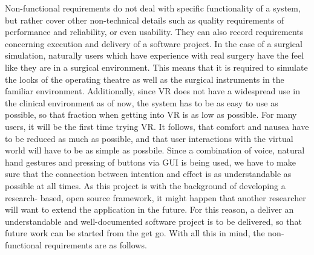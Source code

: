 Non-functional requirements do not deal with specific functionality of a system, but rather cover other non-technical details such as quality requirements of performance and reliability, or even usability.
They can also record requirements concerning execution and delivery of a software project.
\newline
In the case of a surgical simulation, naturally users which have experience with real surgery have the feel like they are in a surgical environment.
This means that it is required to simulate the looks of the operating theatre as well as the surgical instruments in the familiar environment.
Additionally, since VR does not have a widespread use in the clinical environment as of now, the system has to be as easy to use as possible, so that fraction when getting into VR is as low as possible.
For many users, it will be the first time trying VR.
It follows, that comfort and nausea have to be reduced as much as possible, and that user interactions with the virtual world will have to be as simple as possbile.
Since a combination of voice, natural hand gestures and pressing of buttons via GUI is being used, we have to make sure that the connection between intention and effect is as understandable as possible at all times.
As this project is with the background of developing a research- based, open source framework, it might happen that another researcher will want to extend the application in the future.
For this reason, a deliver an understandable and well-documented software project is to be delivered, so that future work can be started from the get go.
With all this in mind, the non-functional requirements are as follows.


